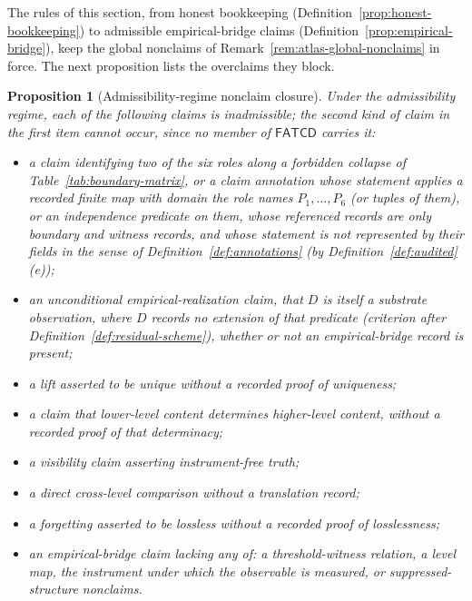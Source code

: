 \documentclass[11pt]{article}
\newtheorem{proposition}[theorem]{Proposition}
\theoremstyle{definition}
\newcommand{\FATCD}{\ensuremath{\mathsf{FATCD}}}
\begin{document}
The rules of this section, from honest bookkeeping
(Definition~\ref{prop:honest-bookkeeping}) to admissible empirical-bridge
claims (Definition~\ref{prop:empirical-bridge}), keep the global
nonclaims of Remark~\ref{rem:atlas-global-nonclaims} in force. The next
proposition lists the overclaims they block.

\begin{proposition}[Admissibility-regime nonclaim closure]\label{prop:nonclaim-closure}
Under the admissibility regime, each of the following claims is
inadmissible; the second kind of claim in the first item cannot occur, since
no member of \FATCD{} carries it:
\begin{itemize}[topsep=2pt,itemsep=1pt]
  \item a claim identifying two of the six roles along a forbidden collapse
    of Table~\ref{tab:boundary-matrix}, or a claim annotation whose statement applies
    a recorded finite map with domain the role names \(P_1,\dots,P_6\) (or
    tuples of them), or an independence predicate on them, whose referenced
    records are only boundary and witness records, and whose statement is not
    represented by their fields in the sense of
    Definition~\ref{def:annotations} (by Definition~\ref{def:audited}(e));
  \item an unconditional empirical-realization claim, that \(D\) is itself a
    substrate observation, where \(D\) records no extension of that
    predicate (criterion after Definition~\ref{def:residual-scheme}), whether
    or not an empirical-bridge record is present;
  \item a lift asserted to be unique without a recorded proof of uniqueness;
  \item a claim that lower-level content determines higher-level content,
    without a recorded proof of that determinacy;
  \item a visibility claim asserting instrument-free truth;
  \item a direct cross-level comparison without a translation record;
  \item a forgetting asserted to be lossless without a recorded proof of
    losslessness;
  \item an empirical-bridge claim lacking any of: a threshold-witness
    relation, a level map, the instrument under which the observable is
    measured, or suppressed-structure nonclaims.
\end{itemize}
\end{proposition}
\end{document}
